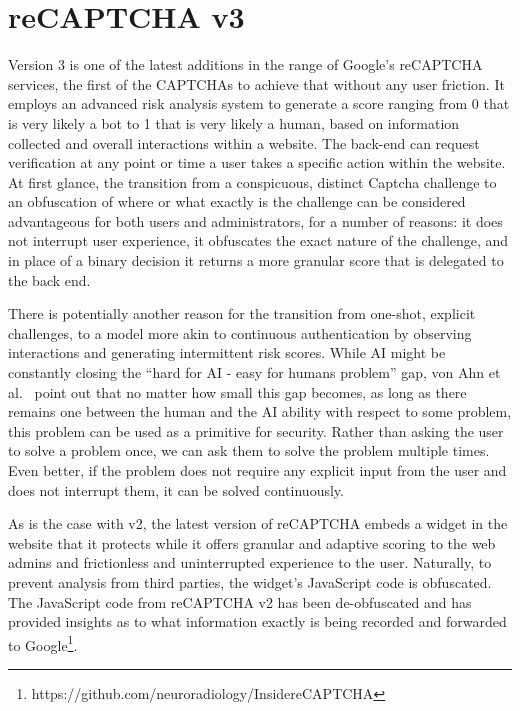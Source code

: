 \section{reCAPTCHA v3}
\label{sec:recap}

Version 3 is one of the latest additions in the range of Google's reCAPTCHA services, the first of the CAPTCHAs to achieve that without any user friction.
It employs an advanced risk analysis system to generate a score ranging from 0 that is very likely a bot to 1 that is very likely a human, based on information collected and overall interactions within a website.
The back-end can request verification at any point or time a user takes a specific action within the website.
At first glance, the transition from a conspicuous, distinct Captcha challenge to an obfuscation of where or what exactly is the challenge can be considered advantageous for both users and administrators, for a number of reasons: it does not interrupt user experience, it obfuscates the exact nature of the challenge, and in place of a binary decision it returns a more granular score that is delegated to the back end.

There is potentially another reason for the transition from one-shot, explicit challenges, to a model more akin to continuous authentication by observing interactions and generating intermittent risk scores.
While \gls{AI} might be constantly closing the ``hard for AI - easy for humans problem'' gap, von Ahn et al.~\cite{von2003captcha} point out that no matter how small this gap becomes, as long as there remains one between the human and the AI ability with respect to some problem, this problem can be used as a primitive for security.
Rather than asking the user to solve a problem once, we can ask them to solve the problem multiple times.
Even better, if the problem does not require any explicit input from the user and does not interrupt them, it can be solved continuously.

As is the case with v2, the latest version of reCAPTCHA embeds a widget in the website that it protects while it offers granular and adaptive scoring to the web admins and frictionless and uninterrupted experience to the user.
Naturally, to prevent analysis from third parties, the widget's JavaScript code is obfuscated.
The JavaScript code from reCAPTCHA v2 has been de-obfuscated and has provided insights as to what information exactly is being recorded and forwarded to Google\footnote{https://github.com/neuroradiology/InsidereCAPTCHA}.

